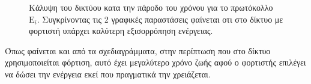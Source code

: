 \begin{figure}[H]
  \centering
  \caption{Κάλυψη του δικτύου κατα την πάροδο του χρόνου για το πρωτόκολλο $\text{E}_{i}$. Συγκρίνοντας τις 2 γραφικές παραστάσεις φαίνεται οτι στο δίκτυο με
φορτιστή υπάρχει καλύτερη εξισορρόπηση ενέργειας.}
  \label{fig:1exp_4_3}
\end{figure}

Όπως φαίνεται και από τα σχεδιαγράμματα, στην περίπτωση που στο δίκτυο χρησιμοποιείται φόρτιση, αυτό έχει μεγαλύτερο χρόνο ζωής αφού ο φορτιστής επιλέγει να δώσει
την ενέργεια εκεί που πραγματικά την χρειάζεται.







